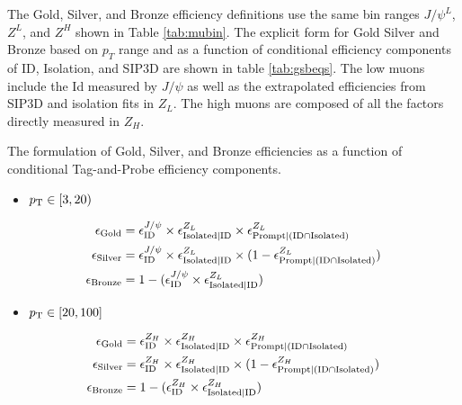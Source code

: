  The Gold, Silver, and Bronze efficiency definitions use the same bin ranges $J/\psi^L$, $Z^L$, and $Z^H$ shown in Table \ref{tab:mubin}. The explicit form for Gold Silver and Bronze based on $p_T$ range and as a function of conditional efficiency components of ID, Isolation, and SIP3D are shown in table \ref{tab:gsbeqs}. The low \pt muons include the Id measured by $J/\psi$ as well as the extrapolated efficiencies from SIP3D and isolation fits in $Z_{L}$. The high \pt muons are composed of all the factors directly measured in $Z_H$.
\begin{table}
\caption{The formulation of Gold, Silver, and Bronze efficiencies as a function of conditional Tag-and-Probe efficiency components.} 
\label{tab:gsbeqs}
\begin{itemize}
\item[] $p_{\mathrm{T}} \in [3,20)$
\end{itemize}
\begin{equation}\label{eq:effcomp_J}
\begin{split}
\epsilon_{\text{Gold}}& = \epsilon_{\text{ID}}^{J/\psi}\times \epsilon_{\text{Isolated}|\text{ID}}^{Z_L} \times \epsilon_{\text{Prompt}|(\text{ID} \cap \text{Isolated})}^{Z_L} \\
\epsilon_{\text{Silver}}& = \epsilon_{\text{ID}}^{J/\psi} \times \epsilon_{\text{Isolated}|\text{ID}}^{Z_L} \times (1-\epsilon_{\text{Prompt}|(\text{ID} \cap \text{Isolated})}^{Z_L}) \\
\epsilon_{\text{Bronze}}& = 1-(\epsilon_{\text{ID}}^{J/\psi} \times \epsilon_{\text{Isolated}|\text{ID}}^{Z_L})
\end{split}
\end{equation}
\begin{itemize}
\item[] $p_{\mathrm{T}} \in [20,100 ]$
\end{itemize}
\begin{equation}\label{eq:effcomp_Z}
\begin{split}
\epsilon_{\text{Gold}}& = \epsilon_{\text{ID}}^{Z_H}\times\epsilon_{\text{Isolated}|\text{ID}}^{Z_H}\times\epsilon_{\text{Prompt}|(\text{ID} \cap \text{Isolated})}^{Z_H} \\
\epsilon_{\text{Silver}}& = \epsilon_{\text{ID}}^{Z_H}\times\epsilon_{\text{Isolated}|\text{ID}}^{Z_H}\times(1-\epsilon_{\text{Prompt}|(\text{ID} \cap \text{Isolated})}^{Z_H})\\
\epsilon_{\text{Bronze}}& = 1-(\epsilon_{\text{ID}}^{Z_H} \times \epsilon_{\text{Isolated}|\text{ID}}^{Z_H})
\end{split}
\end{equation}

\end{table}

